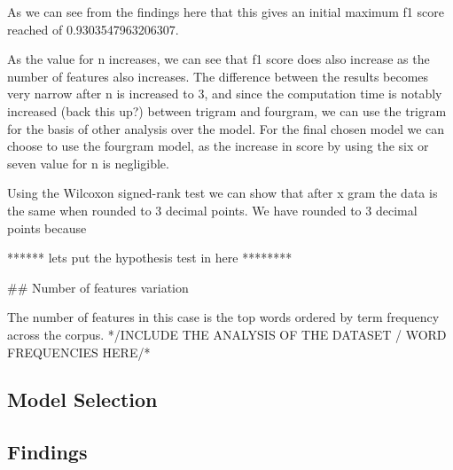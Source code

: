 As we can see from the findings here that this gives an initial maximum f1 score reached of 0.9303547963206307.

As the value for n increases, we can see that f1 score does also increase as the number of features also increases. 
The difference between the results becomes very narrow after n is increased to 3, and since the computation time is notably increased (back this up?) between trigram and fourgram, we can use the trigram for the basis of other analysis over the model.
For the final chosen model we can choose to use the fourgram model, as the increase in score by using the six or seven value for n is negligible.

Using the Wilcoxon signed-rank test we can show that after x gram the data is the same when rounded to 3 decimal points. We have rounded to 3 decimal points because 



****** lets put the hypothesis test in here ********

## Number of features variation 
 
 The number of features in this case is the top words ordered by term frequency across the corpus.
 */INCLUDE THE ANALYSIS OF THE DATASET / WORD FREQUENCIES HERE/* 
 
 
\subsection{Model Selection}




\subsection{Findings}